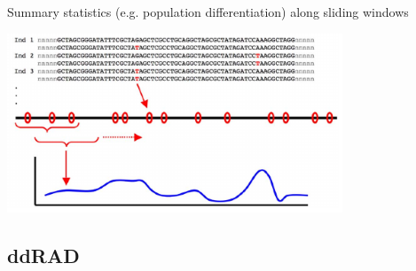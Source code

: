 \documentclass[presentation]{beamer}
\begin{document}
\begin{frame}[label=sec-2-1-10]{Summary statistics (e.g. population differentiation) along sliding windows}
\begin{center}

\includegraphics[width=10cm]{HohenloheFig2b.png}

\tiny{\citep{Hohenlohe2010}}
\end{center}
\end{frame}




\subsection{ddRAD}
\label{sec-2-2}
\end{document}
